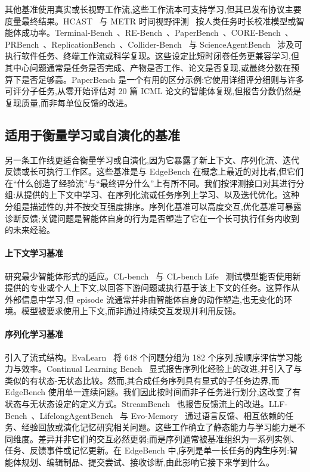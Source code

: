 其他基准使用真实或长视野工作流,这些工作流本可支持学习,但其已发布协议主要度量最终结果。HCAST~\cite{rein2025hcast} 与 METR 时间视野评测~\cite{kwa2025measuring} 按人类任务时长校准模型或智能体成功率。Terminal-Bench~\cite{merrill2026terminalbench}、RE-Bench~\cite{wijk2025rebench}、PaperBench~\cite{starace2025paperbench}、CORE-Bench~\cite{siegel2024corebench}、PRBench~\cite{qiu2026prbench}、ReplicationBench~\cite{ye2025replicationbench}、Collider-Bench~\cite{faroughy2026colliderbench} 与 ScienceAgentBench~\cite{chen2025scienceagentbench} 涉及可执行软件任务、终端工作流或科学复现。这些设定比短时闭卷任务更兼容学习,但其中心问题通常是任务是否完成、产物是否工作、论文是否复现,或最终分数在预算下是否足够高。PaperBench 是一个有用的区分示例:它使用详细评分细则与许多可评分子任务,从零开始评估对 20 篇 ICML 论文的智能体复现,但报告分数仍然是复现质量,而非每单位反馈的改进。

\subsection{适用于衡量学习或自演化的基准}
\label{app:related-sel}

另一条工作线更适合衡量学习或自演化,因为它暴露了新上下文、序列化流、迭代反馈或长可执行工作区。这些基准是与 EdgeBench 在概念上最近的对比者,但它们在``什么创造了经验流''与``最终评分什么''上有所不同。我们按评测接口对其进行分组:从提供的上下文中学习、在序列化流或任务序列上学习、以及迭代优化。这种分组是描述性的,并不按交互强度排序。序列化基准可以高度交互,优化基准可暴露诊断反馈;关键问题是智能体自身的行为是否塑造了它在一个长可执行任务内收到的未来经验。

\paragraph{上下文学习基准}研究最少智能体形式的适应。CL-bench~\cite{dou2026clbench} 与 CL-bench Life~\cite{dou2026clbenchlife} 测试模型能否使用新提供的专业或个人上下文,以回答下游问题或执行基于该上下文的任务。这算作从外部信息中学习,但 episode 流通常并非由智能体自身的动作塑造,也无变化的环境。模型被要求使用上下文,而非通过持续交互发现并利用反馈。

\paragraph{序列化学习基准}引入了流式结构。EvaLearn~\cite{dou2025evalearn} 将 648 个问题分组为 182 个序列,按顺序评估学习能力与效率。Continual Learning Bench~\cite{asawa2026clbench} 显式报告序列化经验上的改进,并引入了与  类似的有状态-无状态比较。然而,其合成任务序列具有显式的子任务边界,而 EdgeBench 使用单一连续问题。我们因此按时间而非子任务进行划分,这改变了有状态与无状态设定的定义方式。StreamBench~\cite{wu2024streambench} 也报告反馈流上的改进。LLF-Bench~\cite{cheng2023llfbench}、LifelongAgentBench~\cite{zheng2025lifelong} 与 Evo-Memory~\cite{wei2025evomemory} 通过语言反馈、相互依赖的任务、经验回放或演化记忆研究相关问题。这些工作确立了静态能力与学习能力是不同维度。差异并非它们的交互必然更弱;而是序列通常被基准组织为一系列实例、任务、反馈事件或记忆更新。在 EdgeBench 中,序列是单一长任务的\textbf{内生}序列:智能体规划、编辑制品、提交尝试、接收诊断,由此影响它接下来学到什么。

